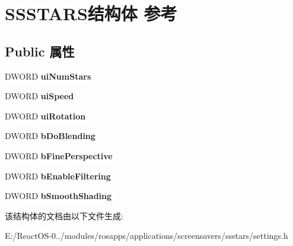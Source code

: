 \hypertarget{struct_s_s_s_t_a_r_s}{}\section{S\+S\+S\+T\+A\+R\+S结构体 参考}
\label{struct_s_s_s_t_a_r_s}
\subsection*{Public 属性}
\begin{DoxyCompactItemize}
\item 
\mbox{\label{struct_s_s_s_t_a_r_s_ab6c64b7fdf5759a06e40a26a0c10724f}} 
D\+W\+O\+RD {\bfseries ui\+Num\+Stars}
\item 
\mbox{\label{struct_s_s_s_t_a_r_s_aca74da1e56de99dd58446926b116ef0b}} 
D\+W\+O\+RD {\bfseries ui\+Speed}
\item 
\mbox{\label{struct_s_s_s_t_a_r_s_a783dcb04f36660661b723ba3bb950128}} 
D\+W\+O\+RD {\bfseries ui\+Rotation}
\item 
\mbox{\label{struct_s_s_s_t_a_r_s_a9cf46589335b170970aebb9348ed7c5f}} 
D\+W\+O\+RD {\bfseries b\+Do\+Blending}
\item 
\mbox{\label{struct_s_s_s_t_a_r_s_a44c22347e81fc8fd4fab75ff136dd7ca}} 
D\+W\+O\+RD {\bfseries b\+Fine\+Perspective}
\item 
\mbox{\label{struct_s_s_s_t_a_r_s_a994b26d2ab9ce2c8601a7f6200c64fed}} 
D\+W\+O\+RD {\bfseries b\+Enable\+Filtering}
\item 
\mbox{\label{struct_s_s_s_t_a_r_s_a8687c7fd3918fa095d8cefc505baa1d3}} 
D\+W\+O\+RD {\bfseries b\+Smooth\+Shading}
\end{DoxyCompactItemize}


该结构体的文档由以下文件生成\+:\begin{DoxyCompactItemize}
\item 
E\+:/\+React\+O\+S-\/0../modules/rosapps/applications/screensavers/ssstars/settings.\+h\end{DoxyCompactItemize}
